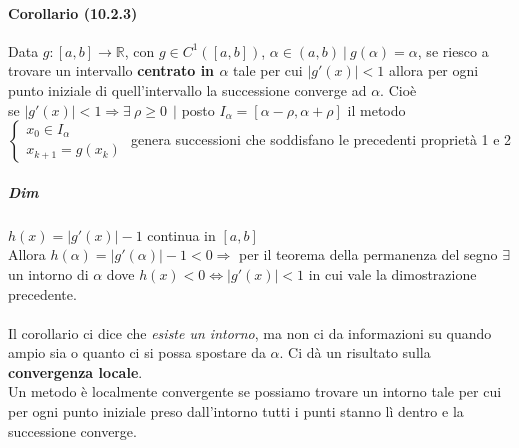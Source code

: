 \documentclass[10pt]{book}
\begin{document}
\paragraph{Corollario (10.2.3)} Data $g : [a, b] \rightarrow\mathbb{R}$, con $g \in C^1([a, b])$, $\alpha \in (a, b)\:|\:g(\alpha) = \alpha$, se riesco a trovare un intervallo \textbf{centrato in $\alpha$} tale per cui $|g'(x)| < 1$ allora per ogni punto iniziale di quell'intervallo la successione converge ad $\alpha$. Cioè\\
se $|g'(x)| < 1 \Rightarrow \exists\:\rho\geq 0\:\:|$ posto $I_\alpha = [\alpha - \rho, \alpha + \rho]$ il metodo $\left\{\begin{array}{l}
x_0 \in I_\alpha\\
x_{k+1} = g(x_k)
\end{array}\right.$ genera successioni che soddisfano le precedenti proprietà 1 e 2
\subparagraph{Dim} $h(x) = |g'(x)| - 1$ continua in $[a, b]$\\
Allora $h(\alpha) = |g'(\alpha)| - 1 < 0 \Rightarrow$ per il teorema della permanenza del segno $\exists$ un intorno di $\alpha$ dove $h(x) < 0 \Leftrightarrow |g'(x)| < 1$ in cui vale la dimostrazione precedente.\\\\
Il corollario ci dice che \textit{esiste un intorno}, ma non ci da informazioni su quando ampio sia o quanto ci si possa spostare da $\alpha$. Ci dà un risultato sulla \textbf{convergenza locale}.\\
Un metodo è localmente convergente se possiamo trovare un intorno tale per cui per ogni punto iniziale preso dall'intorno tutti i punti stanno lì dentro e la successione converge.
\end{document}
